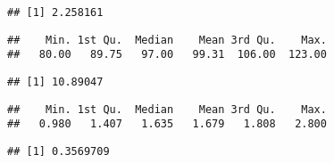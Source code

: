 \documentclass[
]{article}
\newenvironment{Shaded}{\begin{snugshade}}{\end{snugshade}}
\newcommand{\DataTypeTok}[1]{\textcolor[rgb]{0.13,0.29,0.53}{#1}}
\newcommand{\KeywordTok}[1]{\textcolor[rgb]{0.13,0.29,0.53}{\textbf{#1}}}
\newcommand{\NormalTok}[1]{#1}
\newcommand{\OperatorTok}[1]{\textcolor[rgb]{0.81,0.36,0.00}{\textbf{#1}}}
\newcommand{\StringTok}[1]{\textcolor[rgb]{0.31,0.60,0.02}{#1}}
\begin{document}
\begin{verbatim}
## [1] 2.258161
\end{verbatim}

\begin{Shaded}
\end{Shaded}

\begin{verbatim}
##    Min. 1st Qu.  Median    Mean 3rd Qu.    Max. 
##   80.00   89.75   97.00   99.31  106.00  123.00
\end{verbatim}

\begin{Shaded}
\end{Shaded}

\begin{verbatim}
## [1] 10.89047
\end{verbatim}

\begin{Shaded}
\end{Shaded}

\begin{verbatim}
##    Min. 1st Qu.  Median    Mean 3rd Qu.    Max. 
##   0.980   1.407   1.635   1.679   1.808   2.800
\end{verbatim}

\begin{Shaded}
\end{Shaded}

\begin{verbatim}
## [1] 0.3569709
\end{verbatim}

\begin{Shaded}
\end{Shaded}
\end{document}
